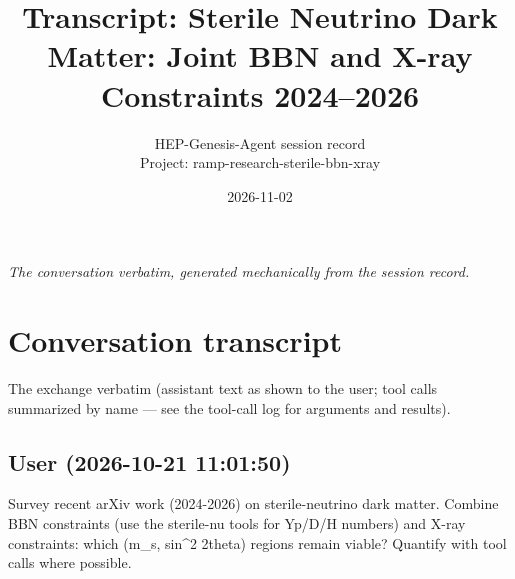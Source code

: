 \documentclass[11pt,a4paper]{article}
\title{Transcript: Sterile Neutrino Dark Matter: Joint BBN and X-ray Constraints 2024--2026}
\author{HEP-Genesis-Agent session record \\ \small Project: ramp-research-sterile-bbn-xray}
\date{2026-11-02}
\begin{document}
\maketitle
\noindent\textit{\small The conversation verbatim, generated mechanically from the session record.}
\vspace{1em}



\appendix
\section{Conversation transcript}
\label{app:transcript}
The exchange verbatim (assistant text as shown to the user; tool calls summarized by name --- see the tool-call log for arguments and results).
\subsection*{User \small(2026-10-21 11:01:50)}
Survey recent arXiv work (2024-2026) on sterile-neutrino dark matter. Combine BBN constraints (use the sterile-nu tools for Yp/D/H numbers) and X-ray constraints: which (m\_s, sin\textasciicircum{}2 2theta) regions remain viable? Quantify with tool calls where possible.
\end{document}
